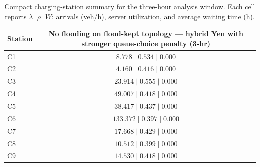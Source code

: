 \begin{table}[h!]
\centering
\small
\setlength{\tabcolsep}{4pt}
\renewcommand{\arraystretch}{1.15}
\begin{tabular}{lc}
\toprule
Station & No flooding on flood-kept topology — hybrid Yen with stronger queue-choice penalty (3-hr) \\
\midrule
C1 & $8.778\;|\;0.534\;|\;0.000$ \\
C2 & $4.160\;|\;0.416\;|\;0.000$ \\
C3 & $23.914\;|\;0.555\;|\;0.000$ \\
C4 & $49.007\;|\;0.418\;|\;0.000$ \\
C5 & $38.417\;|\;0.437\;|\;0.000$ \\
C6 & $133.372\;|\;0.397\;|\;0.000$ \\
C7 & $17.668\;|\;0.429\;|\;0.000$ \\
C8 & $10.512\;|\;0.399\;|\;0.000$ \\
C9 & $14.530\;|\;0.418\;|\;0.000$ \\
\bottomrule
\end{tabular}
\caption{Compact charging-station summary for the three-hour analysis window. Each cell reports $\lambda\,|\,\rho\,|\,W$: arrivals (veh/h), server utilization, and average waiting time (h).}
\label{tab:chicago_no_flood_on_flood_kept_topology_hybrid_tree_yen_stronger_queue_penalty_station_compact}
\end{table}
